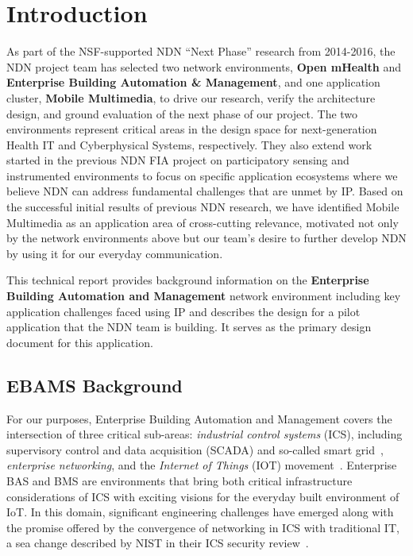 \section{Introduction}

As part of the NSF-supported NDN ``Next Phase'' research from 2014-2016, 
the NDN project team has selected two network environments, {\bf Open mHealth} and {\bf
Enterprise Building Automation \& Management}, and one application
cluster, {\bf Mobile Multimedia}, to drive our research, verify the
architecture design, and ground evaluation of the next phase of our project.
The two environments represent critical areas in the design space for
next-generation Health IT and Cyberphysical Systems, respectively.  They
also extend work started in the previous NDN FIA project on participatory
sensing and instrumented environments to focus on specific application
ecosystems where we believe NDN can address fundamental challenges that
are unmet by IP.  Based on the successful initial results of previous
NDN research, we have identified Mobile  Multimedia as an application
area of cross-cutting relevance, motivated not only by the
network environments above but our team's desire to further develop
NDN by using it for our everyday communication.

This technical report provides background information on the {\bf Enterprise Building Automation and Management}
network environment including key application challenges faced using
IP and describes the design for a pilot application that the NDN team is 
building.  It serves as the primary design document for this application. 

\subsection{EBAMS Background}

For our purposes, Enterprise Building Automation and Management covers the intersection of three critical sub-areas: \emph{industrial control systems} (ICS), including supervisory control and data acquisition (SCADA) and so-called smart grid~\cite{fang2011smart}, \emph{enterprise networking}, and the \emph{Internet of Things} (IOT) movement~\cite{atzori2010internet}. Enterprise BAS and BMS are environments that bring both critical infrastructure considerations of ICS with exciting visions for the everyday built environment of IoT.  In this domain, significant engineering challenges have emerged along with the promise offered by the convergence of networking in ICS with traditional IT, a sea change described by NIST in their ICS security review~\cite{NIST_ICS}.  

